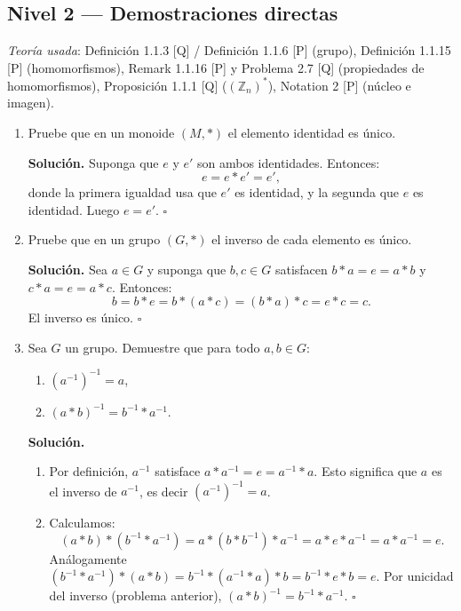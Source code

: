 \subsection*{Nivel 2 --- Demostraciones directas}

\textit{Teoría usada}: Definición 1.1.3 [Q] / Definición 1.1.6 [P] (grupo),
Definición 1.1.15 [P] (homomorfismos), Remark 1.1.16 [P] y Problema 2.7 [Q]
(propiedades de homomorfismos), Proposición 1.1.1 [Q] (\((\mathbb{Z}_n)^*\)),
Notation 2 [P] (núcleo e imagen).

\bigskip

\begin{enumerate}[label=\textbf{2.\arabic*.}]

\item Pruebe que en un monoide \((M,*)\) el elemento identidad es único.

\textbf{Solución.}
Suponga que \(e\) y \(e'\) son ambos identidades. Entonces:
\[
    e = e * e' = e',
\]
donde la primera igualdad usa que \(e'\) es identidad, y la segunda que \(e\) es identidad.
Luego \(e = e'\). \hfill\(\square\)

\item Pruebe que en un grupo \((G,*)\) el inverso de cada elemento es único.

\textbf{Solución.}
Sea \(a \in G\) y suponga que \(b, c \in G\) satisfacen \(b*a = e = a*b\) y
\(c*a = e = a*c\). Entonces:
\[
    b = b*e = b*(a*c) = (b*a)*c = e*c = c.
\]
El inverso es único. \hfill\(\square\)

\item Sea \(G\) un grupo. Demuestre que para todo \(a,b \in G\):
\begin{enumerate}[label=\alph*)]
    \item \((a^{-1})^{-1} = a\),
    \item \((a*b)^{-1} = b^{-1}*a^{-1}\).
\end{enumerate}

\textbf{Solución.}
\begin{enumerate}[label=\alph*)]
    \item Por definición, \(a^{-1}\) satisface \(a*a^{-1}=e=a^{-1}*a\). Esto significa
    que \(a\) es el inverso de \(a^{-1}\), es decir \((a^{-1})^{-1}=a\).
    \item Calculamos:
    \[
        (a*b)*(b^{-1}*a^{-1}) = a*(b*b^{-1})*a^{-1} = a*e*a^{-1} = a*a^{-1}=e.
    \]
    Análogamente \((b^{-1}*a^{-1})*(a*b) = b^{-1}*(a^{-1}*a)*b = b^{-1}*e*b = e\).
    Por unicidad del inverso (problema anterior), \((a*b)^{-1} = b^{-1}*a^{-1}\).
    \hfill\(\square\)
\end{enumerate}


\end{enumerate}
